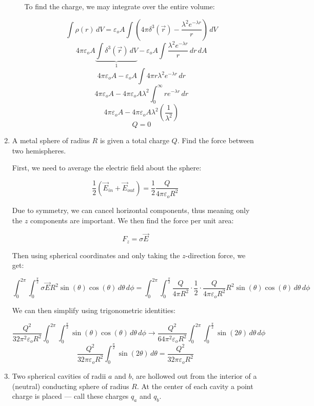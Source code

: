 \begin{enumerate}
\begin{enumerate}
        To find the charge, we may integrate over the entire volume:

        $$\int\rho(r)\,dV=\varepsilon_oA\int\left( 4\pi\delta^3(\vec{r})-\frac{\lambda^2e^{-\lambda r}}{r} \right)\,dV$$
        $$4\pi\varepsilon_oA\underbrace{\int\delta^3(\vec{r})\,dV}_{1}-\varepsilon_oA\int\frac{\lambda^2e^{-\lambda r}}{r}\,dr\,dA$$
        $$4\pi\varepsilon_oA-\varepsilon_oA\int4\pi r\lambda^2e^{-\lambda r}\,dr$$
        $$4\pi\varepsilon_oA-4\pi\varepsilon_oA\lambda^2\int_0^\infty re^{-\lambda r}\,dr$$
        $$4\pi\varepsilon_oA-4\pi\varepsilon_oA\lambda^2\left( \frac{1}{\lambda^2} \right)$$
        $$\boxed{Q=0}$$

    \end{enumerate}

  \item A metal sphere of radius $R$ is given a total charge $Q$. Find the force between two hemispheres.

    First, we need to average the electric field about the sphere:

    $$\frac{1}{2}\left( \vec{E}_{in}+\vec{E}_{out} \right)=\frac{1}{2}\frac{Q}{4\pi\varepsilon_oR^2}$$

    Due to symmetry, we can cancel horizontal components, thus meaning only the $z$ components are important. We then find the force per unit area:

    $$F_z=\sigma \vec{E}$$

    Then using spherical coordinates and only taking the $z$-direction force, we get:

    $$\int_0^{2\pi}\int_0^{\frac{\pi}{2}}\sigma \vec{E}R^2\sin(\theta)\cos(\theta)\,d\theta\,d\phi=\int_0^{2\pi}\int_0^{\frac{\pi}{2}}\frac{Q}{4\pi R^2}\cdot\frac{1}{2}\cdot\frac{Q}{4\pi\varepsilon_oR^2} R^2\sin(\theta)\cos(\theta)\,d\theta\,d\phi$$

    We can then simplify using trigonometric identities:

    $$\frac{Q^2}{32\pi^2 \varepsilon_oR^2}\int_0^{2\pi}\int_0^{\frac{\pi}{2}}\sin(\theta)\cos(\theta)\,d\theta\,d\phi\rightarrow\frac{Q^2}{64\pi^2 \varepsilon_oR^2}\int_0^{2\pi}\int_0^{\frac{\pi}{2}}\sin(2\theta)\,d\theta\,d\phi$$
    $$\boxed{\frac{Q^2}{32\pi \varepsilon_oR^2}\int_0^{\frac{\pi}{2}}\sin(2\theta)\,d\theta=\frac{Q^2}{32\pi \varepsilon_oR^2}}$$

  \item Two spherical cavities of radii $a$ and $b$, are hollowed out from the interior of a (neutral) conducting sphere of radius $R$.  At the center of each cavity a point charge is placed — call these charges $q_a$ and $q_b$.


\end{enumerate}
